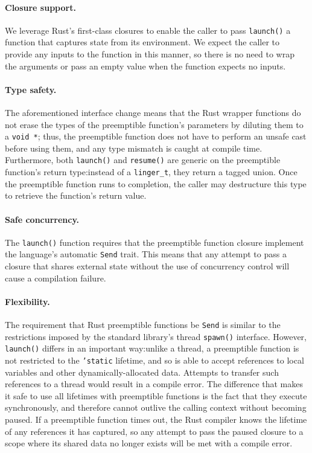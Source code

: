 \paragraph{Closure support.}
We leverage Rust's first-class closures to enable the caller to pass
\texttt{launch()} a function that captures state from its environment.  We expect the
caller to provide any inputs to the function in this manner, so there is no need to
wrap the arguments or pass an empty value when the function expects no inputs.


\paragraph{Type safety.}
The aforementioned interface change means that the Rust wrapper functions do not
erase the types of the preemptible function's parameters by diluting them to a
\texttt{void *}; thus, the preemptible function does not have to perform an unsafe
cast before using them, and any type mismatch is caught at compile time.
Furthermore, both \texttt{launch()} and \texttt{resume()} are generic on the
preemptible function's return type:\@ instead of a \texttt{linger\_t}, they return a
tagged union.  Once the preemptible function runs to completion, the caller may
destructure this type to retrieve the function's return value.


\paragraph{Safe concurrency.}
The \texttt{launch()} function requires that the preemptible function closure
implement the language's automatic \texttt{Send} trait.  This means that any attempt
to pass a closure that shares external state without the use of concurrency control
will cause a compilation failure.


\paragraph{Flexibility.}
The requirement that Rust preemptible functions be \texttt{Send} is similar to the
restrictions imposed by the standard library's thread \texttt{spawn()} interface.
However, \texttt{launch()} differs in an important way:\@ unlike a thread, a
preemptible function is not restricted to the \texttt{'static} lifetime, and so is
able to accept references to local variables and other dynamically-allocated data.
Attempts to transfer such references to a thread would result in a compile error.
The difference that makes it safe to use all lifetimes with preemptible functions is
the fact that they execute synchronously, and therefore cannot outlive the calling
context without becoming paused.  If a preemptible function times out, the Rust
compiler knows the lifetime of any references it has captured, so any attempt to pass
the paused closure to a scope where its shared data no longer exists will be met with
a compile error.


